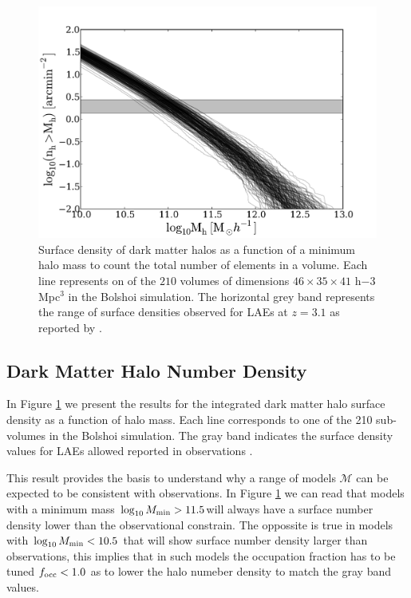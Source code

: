 \documentclass[usenatbib]{mn2e}
\newcommand{\hMsun}{{\ifmmode{h^{-1}{\rm
        {M_{\odot}}}}\else{$h^{-1}{\rm{M_{\odot}}}$}\fi}}
\begin{document}
\begin{figure}
\begin{center}
\includegraphics[width=1.10\linewidth,angle=0]{./plots/Fig1.pdf}
\caption{ \label{fig:halos} Surface density of dark
  matter halos as a function of a minimum halo mass to count the
  total number of elements in a volume. Each line represents on of the
  $210$ volumes of dimensions $46\times 35\times 41$ h${-3}$Mpc$^{3}$
  in the Bolshoi simulation. The horizontal grey band represents the
  range of surface densities observed for LAEs at $z=3.1$ as reported
  by \citep{Yamada2012}.}
\end{center} 
\end{figure}


\subsection{Dark Matter Halo Number Density}

In Figure \ref{fig:halos} we present the results for  the
integrated dark matter halo surface density as a function of halo
mass. Each line corresponds to one of the 210 sub-volumes in the
Bolshoi simulation. The gray band indicates the surface density
values for LAEs allowed reported in observations \citep{Yamada2012}.
 
This result provides the basis to understand why a range of models
${\mathcal M}$ can be expected to be consistent with
observations. In Figure \ref{fig:halos} we can read that models
with a minimum mass $\log_{10} M_{\rm min}>11.5$\hMsun will always have a
surface number density lower than the observational
constrain. The oppossite is true in models with $\log_{10} M_{\rm min}<10.5$
that will show surface number density larger than observations, this
implies that in such models the occupation fraction has to be tuned
$f_{\rm occ}<1.0$ as to lower the halo numeber density to match the
gray band values.
\end{document}
